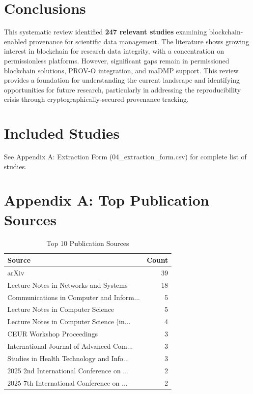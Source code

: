\documentclass{article}
\begin{document}
\section{Conclusions}

This systematic review identified \textbf{247 relevant studies} examining blockchain-enabled provenance for scientific data management. 
The literature shows growing interest in blockchain for research data integrity, with a concentration on permissionless platforms. 
However, significant gaps remain in permissioned blockchain solutions, PROV-O integration, and maDMP support. 
This review provides a foundation for understanding the current landscape and identifying opportunities for future research, 
particularly in addressing the reproducibility crisis through cryptographically-secured provenance tracking.

\section{Included Studies}

See Appendix A: Extraction Form (04_extraction_form.csv) for complete list of studies.

\section*{Appendix A: Top Publication Sources}

\begin{table}[htbp]
\centering
\caption{Top 10 Publication Sources}
\begin{tabular}{lr}
\toprule
Source & Count \\
\midrule
arXiv & 39 \\
Lecture Notes in Networks and Systems & 18 \\
Communications in Computer and Inform... & 5 \\
Lecture Notes in Computer Science & 5 \\
Lecture Notes in Computer Science (in... & 4 \\
CEUR Workshop Proceedings & 3 \\
International Journal of Advanced Com... & 3 \\
Studies in Health Technology and Info... & 3 \\
2025 2nd International Conference on ... & 2 \\
2025 7th International Conference on ... & 2 \\
\bottomrule
\end{tabular}
\end{table}
\end{document}
